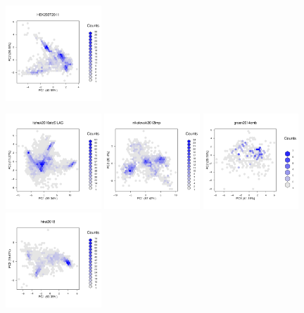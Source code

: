 \documentclass[12pt]{article}\usepackage[]{graphicx}\usepackage[]{color}
\begin{document}
\begin{appendices}
\begin{figure}[htb]
  \includegraphics[width = 0.32\textwidth]{./figure/fighexpca-21.pdf}
\end{figure}
\begin{figure}[htb]
  \includegraphics[width = 0.32\textwidth]{./figure/fighexpca-22.pdf}
  \includegraphics[width = 0.32\textwidth]{./figure/fighexpca-23.pdf}
  \includegraphics[width = 0.32\textwidth]{./figure/fighexpca-24.pdf}
  \includegraphics[width = 0.32\textwidth]{./figure/fighexpca-25.pdf}

\end{figure}
\end{appendices}
\end{document}
